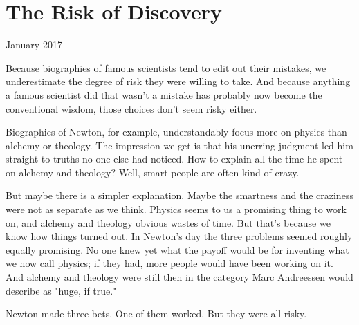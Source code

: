 \chapter{The Risk of Discovery}


            
              
                

January 2017

Because biographies of famous
                  scientists tend to edit out their mistakes, we underestimate
                  the degree of risk they were willing to take. And because
                  anything a famous scientist did that wasn't a mistake has
                  probably now become the conventional wisdom, those choices
                  don't seem risky either.

Biographies of Newton, for
                  example, understandably focus more on physics than alchemy or
                  theology. The impression we get is that his unerring judgment
                  led him straight to truths no one else had noticed. How to
                  explain all the time he spent on alchemy and theology? Well,
                  smart people are often kind of crazy.

But maybe
                  there is a simpler explanation. Maybe the smartness and the
                  craziness were not as separate as we think. Physics seems to
                  us a promising thing to work on, and alchemy and theology
                  obvious wastes of time. But that's because we know how things
                  turned out. In Newton's day the three problems seemed roughly
                  equally promising. No one knew yet what the payoff would be
                  for inventing what we now call physics; if they had, more
                  people would have been working on it. And alchemy and theology
                  were still then in the category Marc Andreessen would describe
                  as "huge, if true."

Newton made three bets. One of
                  them worked. But they were all risky.






              
            
          
